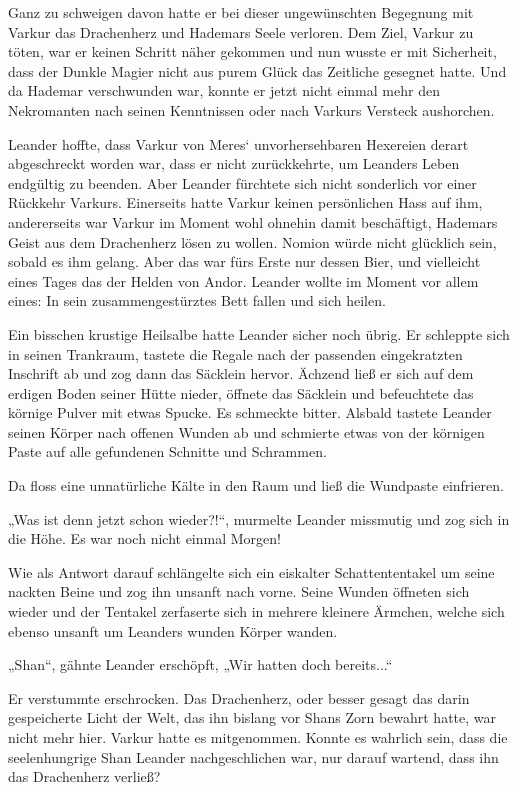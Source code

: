 Ganz zu schweigen davon hatte er bei dieser ungewünschten Begegnung mit Varkur das Drachenherz und Hademars Seele verloren. Dem Ziel, Varkur zu töten, war er keinen Schritt näher gekommen und nun wusste er mit Sicherheit, dass der Dunkle Magier nicht aus purem Glück das Zeitliche gesegnet hatte. Und da Hademar verschwunden war, konnte er jetzt nicht einmal mehr den Nekromanten nach seinen Kenntnissen oder nach Varkurs Versteck aushorchen.

Leander hoffte, dass Varkur von Meres‘ unvorhersehbaren Hexereien derart abgeschreckt worden war, dass er nicht zurückkehrte, um Leanders Leben endgültig zu beenden. Aber Leander fürchtete sich nicht sonderlich vor einer Rückkehr Varkurs. Einerseits hatte Varkur keinen persönlichen Hass auf ihm, andererseits war Varkur im Moment wohl ohnehin damit beschäftigt, Hademars Geist aus dem Drachenherz lösen zu wollen. Nomion würde nicht glücklich sein, sobald es ihm gelang. Aber das war fürs Erste nur dessen Bier, und vielleicht eines Tages das der Helden von Andor. Leander wollte im Moment vor allem eines: In sein zusammengestürztes Bett fallen und sich heilen.

Ein bisschen krustige Heilsalbe hatte Leander sicher noch übrig. Er schleppte sich in seinen Trankraum, tastete die Regale nach der passenden eingekratzten Inschrift ab und zog dann das Säcklein hervor. Ächzend ließ er sich auf dem erdigen Boden seiner Hütte nieder, öffnete das Säcklein und befeuchtete das körnige Pulver mit etwas Spucke. Es schmeckte bitter. Alsbald tastete Leander seinen Körper nach offenen Wunden ab und schmierte etwas von der körnigen Paste auf alle gefundenen Schnitte und Schrammen.

Da floss eine unnatürliche Kälte in den Raum und ließ die Wundpaste einfrieren.

„Was ist denn jetzt schon wieder?!“, murmelte Leander missmutig und zog sich in die Höhe. Es war noch nicht einmal Morgen!

Wie als Antwort darauf schlängelte sich ein eiskalter Schattententakel um seine nackten Beine und zog ihn unsanft nach vorne. Seine Wunden öffneten sich wieder und der Tentakel zerfaserte sich in mehrere kleinere Ärmchen, welche sich ebenso unsanft um Leanders wunden Körper wanden.

„Shan“, gähnte Leander erschöpft, „Wir hatten doch bereits...“

Er verstummte erschrocken. Das Drachenherz, oder besser gesagt das darin gespeicherte Licht der Welt, das ihn bislang vor Shans Zorn bewahrt hatte, war nicht mehr hier. Varkur hatte es mitgenommen. Konnte es wahrlich sein, dass die seelenhungrige Shan Leander nachgeschlichen war, nur darauf wartend, dass ihn das Drachenherz verließ?

